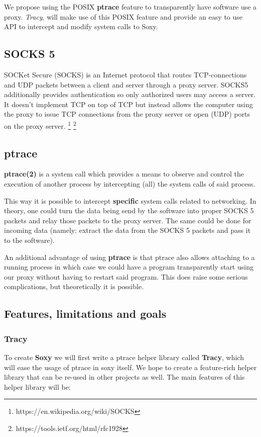 \documentclass[a4paper]{article}
\begin{document}
We propose using the POSIX \textbf{ptrace} feature to transparently have
software use a proxy. \textit{Tracy}, will make use of this POSIX feature and
provide an easy to use API to intercept and modify system calls to Soxy.

\subsection{SOCKS 5}

SOCKet Secure (SOCKS) is an Internet protocol that routes TCP-connections and
UDP packets between a client and server through a proxy server. SOCKS5
additionally provides authentication so only authorized users may access a
server. It doesn't implement TCP on top of TCP but instead allows the computer using
the proxy to issue TCP connections from the proxy server or open (UDP) ports on the
proxy server.
\footnote{https://en.wikipedia.org/wiki/SOCKS}
\footnote{https://tools.ietf.org/html/rfc1928}

\subsection{ptrace}

\textbf{ptrace(2)} is a system call which provides a means to observe and
control the execution of another process by intercepting (all) the system calls
of said process.

This way it is possible to intercept \textbf{specific} system calls related to
networking. In theory, one could turn the data being send by the software into
proper SOCKS 5 packets and relay those packets to the proxy server. The same
could be done for incoming data (namely: extract the data from the SOCKS 5
packets and pass it to the software).

An additional advantage of using \textbf{ptrace} is that ptrace also allows
attaching to a running process in which case we could have a program
transparently start using our proxy without having to restart said program. This
does raise some serious complications, but theoretically it is possible.

\subsection{Features, limitations and goals}

\subsubsection{Tracy}
To create \textbf{Soxy} we will first write a ptrace helper library called
\textbf{Tracy}, which will ease the usage of ptrace in soxy itself.
We hope to create a feature-rich helper library that can be re-used in
other projects as well. The main features of this helper library will be:
\end{document}
